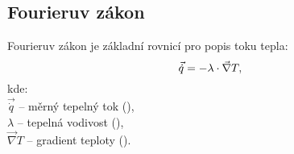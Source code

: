 \documentclass{article}
\begin{document}
\subsection{Fourieruv zákon}
Fourieruv zákon je základní rovnicí pro popis toku tepla:
\begin{equation}
    \vec{\dot{q}} = - \lambda \cdot \vec{\nabla} T,
    \tagaddtext{(\ueqWandMinvsq)}
\end{equation}
kde:\\
$\vec{\dot{q}}$ -- měrný tepelný tok (\ueqWandMinvsq),\\
$\lambda$ -- tepelná vodivost (\ueqWandMinvKinv),\\
$\vec{\nabla} T$ -- gradient teploty (\ueqKandMinv).
\end{document}
